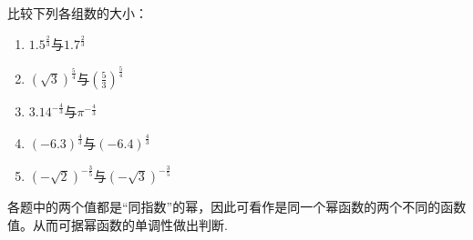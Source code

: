 \begin{example}
    比较下列各组数的大小：
 \begin{multicols}{2}
 \begin{enumerate}[(1)]
     \item $1.5^{\tfrac{2}{3}}$与$1.7^{\tfrac{2}{3}}$
     \item $\left(\sqrt{3}\right)^{\tfrac{5}{4}}$与$\left(\frac{5}{3}\right)^{\tfrac{5}{4}}$
     \item $3.14^{-\tfrac{4}{3}}$与$\pi^{-\tfrac{4}{3}}$
     \item $(-6.3)^{\tfrac{4}{3}}$与$(-6.4)^{\tfrac{4}{3}}$
     \item $\left(-\sqrt{2}\right)^{-\tfrac{3}{5}}$与$\left(-\sqrt{3}\right)^{-\tfrac{3}{5}}$
 \end{enumerate}
 \end{multicols}
 \end{example}
 
 \begin{analyze}
     各题中的两个值都是“同指数”的幂，因此可看作是同一个幂函数的两个不同的函数值。从而可据幂函数的单调性做出判断.
 \end{analyze}
 
